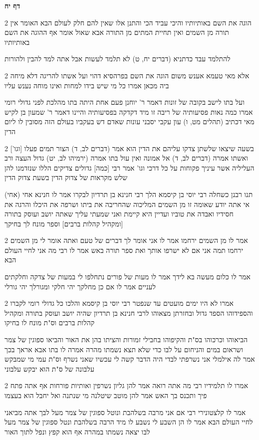 \documentclass[12pt, openany]{book}
\newcommand{\sethebfont}{
\fontsize{10.5pt}{21.0pt} \selectfont
}
\newcommand{\twocol}[1]{
	{\sethebfont \begin{multicols}{2}
			#1
	\end{multicols}}	
}
\newcommand{\sectname}{}
\newcommand{\newsection}[1]{
	\addcontentsline{toc}{section}{#1}
	\renewcommand{\sectname}{#1}	
	\vspace{-\baselineskip}
	\begin{center}
		\textbf{%
\fontsize{16pt}{16pt}\selectfont
			#1}
	\end{center}
	\vspace{-\baselineskip}
	\nopagebreak
}
\begin{document}
\newsection{דף יח}
\twocol{הוגה את השם באותיותיו והיכי עביד הכי והתנן אלו שאין להם חלק לעולם הבא האומר אין תורה מן השמים ואין תחיית המתים מן התורה אבא שאול אומר אף ההוגה את השם באותיותיו
\par להתלמד עבד כדתניא (דברים יח, ט) לא תלמד לעשות אבל אתה למד להבין ולהורות}
\twocol{אלא מאי טעמא אענש משום הוגה את השם בפרהסיא דהוי ועל אשתו להריגה דלא מיחה ביה מכאן אמרו כל מי שיש בידו למחות ואינו מוחה נענש עליו
\par ועל בתו לישב בקובה של זונות דאמר ר' יוחנן פעם אחת היתה בתו מהלכת לפני גדולי רומי אמרו כמה נאות פסיעותיה של ריבה זו מיד דקדקה בפסיעותיה והיינו דאמר ר' שמעון בן לקיש מאי דכתיב (תהלים מט, ו) עון עקבי יסבני עונות שאדם דש בעקביו בעולם הזה מסובין לו ליום הדין}
\twocol{בשעה שיצאו שלשתן צדקו עליהם את הדין הוא אמר (דברים לב, ד) הצור תמים פעלו [וגו'] ואשתו אמרה (דברים לב, ד) אל אמונה ואין עול בתו אמרה (ירמיהו לב, יט) גדול העצה ורב העליליה אשר עיניך פקוחות על כל דרכי וגו' אמר רבי [כמה] גדולים צדיקים הללו שנזדמנו להן שלש מקראות של צדוק הדין בשעת צדוק הדין
\par תנו רבנן כשחלה רבי יוסי בן קיסמא הלך רבי חנינא בן תרדיון לבקרו אמר לו חנינא אחי (אחי) אי אתה יודע שאומה זו מן השמים המליכוה שהחריבה את ביתו ושרפה את היכלו והרגה את חסידיו ואבדה את טוביו ועדיין היא קיימת ואני שמעתי עליך שאתה יושב ועוסק בתורה [ומקהיל קהלות ברבים] וספר מונח לך בחיקך}
\twocol{אמר לו מן השמים ירחמו אמר לו אני אומר לך דברים של טעם ואתה אומר לי מן השמים ירחמו תמה אני אם לא ישרפו אותך ואת ספר תורה באש אמר לו רבי מה אני לחיי העולם הבא
\par אמר לו כלום מעשה בא לידך אמר לו מעות של פורים נתחלפו לי במעות של צדקה וחלקתים לעניים אמר לו אם כן מחלקך יהי חלקי ומגורלך יהי גורלי}
\twocol{אמרו לא היו ימים מועטים עד שנפטר רבי יוסי בן קיסמא והלכו כל גדולי רומי לקברו והספידוהו הספד גדול ובחזרתן מצאוהו לרבי חנינא בן תרדיון שהיה יושב ועוסק בתורה ומקהיל קהלות ברבים וס"ת מונח לו בחיקו
\par הביאוהו וכרכוהו בס"ת והקיפוהו בחבילי זמורות והציתו בהן את האור והביאו ספוגין של צמר ושראום במים והניחום על לבו כדי שלא תצא נשמתו מהרה אמרה לו בתו אבא אראך בכך אמר לה אילמלי אני נשרפתי לבדי היה הדבר קשה לי עכשיו שאני נשרף וס"ת עמי מי שמבקש עלבונה של ס"ת הוא יבקש עלבוני}
\twocol{אמרו לו תלמידיו רבי מה אתה רואה אמר להן גליון נשרפין ואותיות פורחות אף אתה פתח פיך ותכנס בך האש אמר להן מוטב שיטלנה מי שנתנה ואל יחבל הוא בעצמו
\par אמר לו קלצטונירי רבי אם אני מרבה בשלהבת ונוטל ספוגין של צמר מעל לבך אתה מביאני לחיי העולם הבא אמר לו הן השבע לי נשבע לו מיד הרבה בשלהבת ונטל ספוגין של צמר מעל לבו יצאה נשמתו במהרה אף הוא קפץ ונפל לתוך האור}
\end{document}
